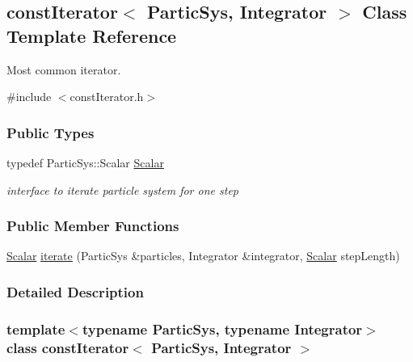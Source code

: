 \hypertarget{classconst_iterator}{}\subsection{const\+Iterator$<$ Partic\+Sys, Integrator $>$ Class Template Reference}
\label{classconst_iterator}


Most common iterator.  




{\ttfamily \#include $<$const\+Iterator.\+h$>$}

\subsubsection*{Public Types}
\begin{DoxyCompactItemize}
\item 
typedef Partic\+Sys\+::\+Scalar \mbox{\hyperlink{classconst_iterator_a7cdf84749facbb55a6a2674646f92f52}{Scalar}}
\begin{DoxyCompactList}\small\item\em interface to iterate particle system for one step \end{DoxyCompactList}\end{DoxyCompactItemize}
\subsubsection*{Public Member Functions}
\begin{DoxyCompactItemize}
\item 
\mbox{\hyperlink{classconst_iterator_a7cdf84749facbb55a6a2674646f92f52}{Scalar}} \mbox{\hyperlink{classconst_iterator_ac38af18a50fbb2aea54656f089911a48}{iterate}} (Partic\+Sys \&particles, Integrator \&integrator, \mbox{\hyperlink{classconst_iterator_a7cdf84749facbb55a6a2674646f92f52}{Scalar}} step\+Length)
\end{DoxyCompactItemize}


\subsubsection{Detailed Description}
\subsubsection*{template$<$typename Partic\+Sys, typename Integrator$>$\newline
class const\+Iterator$<$ Partic\+Sys, Integrator $>$}


